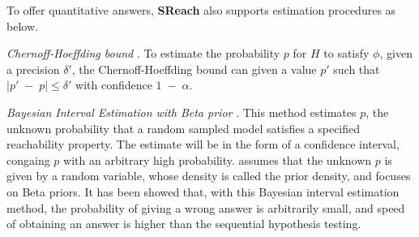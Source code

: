 To offer quantitative answers, {\bf SReach} also supports estimation procedures as below.

\textit{Chernoff-Hoeffding bound} \cite{hoeffding1963probability}. To estimate the probability $p$ for $H$ to satisfy $\phi$, given a precision $\delta'$, the Chernoff-Hoeffding bound can given a value $p'$ such that $|p' \; - \; p| \le \delta'$ with confidence $1\;-\; \alpha$.

\textit{Bayesian Interval Estimation with Beta prior} \cite{zuliani2010bayesian}. This method estimates $p$, the unknown probability that a random sampled model satisfies a specified reachability property. The estimate will be in the form of a confidence interval, congaing $p$ with an arbitrary high probability.  \cite{zuliani2010bayesian} assumes that the unknown $p$ is given by a random variable, whose density is called the prior density, and focuses on Beta priors. It has been showed that, with this Bayesian interval estimation method, the probability of giving a wrong answer is arbitrarily small, and speed of obtaining an answer is higher than the sequential hypothesis testing.